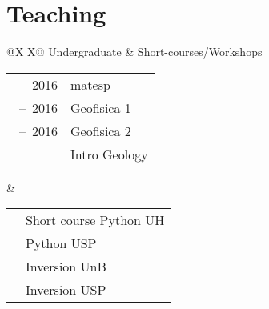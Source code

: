 \documentclass[11pt, a4paper]{article}
\newcommand{\TablePad}{\vspace{-0.4cm}}
\newcommand{\TableTitle}[1]{{\fontsize{14pt}{0}\selectfont \mdseries #1}}
\newcommand{\Duration}[2]{\fontsize{10pt}{0}\selectfont #1\ --\ #2}
\newcommand{\Year}[1]{\fontsize{10pt}{0}\selectfont #1}
\begin{document}
\section*{Teaching}

\TablePad
\begin{tabularx}{\textwidth}{@{}X X@{}}
    \TableTitle{Undergraduate} & \TableTitle{Short-courses/Workshops}
    \\[0.1cm]
    \begin{tabular}{@{}l l}
        \Duration{2014}{2016}  &
         matesp
        \hspace{10cm}
        \\
        \Duration{2014}{2016}  &
         Geofisica 1
        \\
        \Duration{2014}{2016}  &
         Geofisica 2
        \\
        \Year{2015}  &
         Intro Geology
    \end{tabular}
    &
    \begin{tabular}{@{}l l}
        \Year{2017}  &
        Short course Python UH
        \\
        \Year{2016}  &
        Python USP
        \\
        \Year{2014}  &
        Inversion UnB
        \\
        \Year{2011}  &
        Inversion USP
    \end{tabular}
\end{tabularx}
\end{document}
